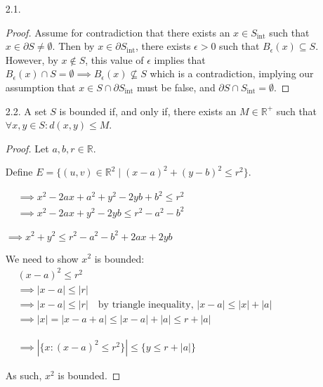 \documentclass{article}
\theoremstyle{definition}
\numberwithin{equation}{section}
\begin{document}
\begin{enumerate}
    \item[2.1.]
    \begin{proof}
        Assume for contradiction that there exists an \(x \in S_{\text{int}}\) such that \(x \in \partial S \neq \emptyset\).
        Then by \(x \in \partial S_{\text{int}}\), there exists \(\epsilon > 0\) such that \(B_{\epsilon}(x) \subseteq S\).
        However, by \(x \notin S\), this value of \(\epsilon\) implies that \(B_{\epsilon}(x) \cap S = \emptyset \implies B_{\epsilon}(x) \nsubseteq S\) which is a contradiction, implying our assumption that \( x \in S \cap \partial S_{\text{int}} \) must be false, and \( \partial S \cap S_{\text{int}} = \emptyset \).
    \end{proof}

    \item[2.2.]
    A set \( S \) is bounded if, and only if, there exists an \( M \in \mathbb{R}^+ \) such that \(\forall x,y \in S: d(x,y) \leq M\).

    \begin{proof}
        Let \(a, b, r \in \mathbb{R}\).

        Define \( E = \{(u, v) \in \mathbb{R}^2 \mid (x-a)^2 + (y-b)^2 \leq r^2\} \).

        $
        \begin{aligned}
            &\implies x^2 - 2ax + a^2 + y^2 - 2yb + b^2 \leq r^2\\
            &\implies x^2 - 2ax + y^2 - 2yb \leq r^2 - a^2 - b^2
        \end{aligned}
        $

        $
        \implies x^2 + y^2 \leq r^2 - a^2 - b^2 + 2ax + 2yb
        $

        We need to show \(x^2\) is bounded:
        $
        \begin{aligned}
            &(x-a)^2 \leq r^2\\
            &\implies |x - a| \leq |r|\\
            &\implies |x - a| \leq |r| \quad \text{by triangle inequality, } |x - a| \leq |x| + |a|\\
            &\implies |x| = |x-a+a| \leq |x - a| + |a| \leq r + |a|
        \end{aligned}
        $

        $
        \begin{aligned}
            &\implies | \{ x : (x - a)^2 \leq r^2\} | \leq \{y \leq r + |a|\}
        \end{aligned}
        $

        As such, \( x^2\) is bounded.
    \end{proof}

\end{enumerate}
\end{document}
